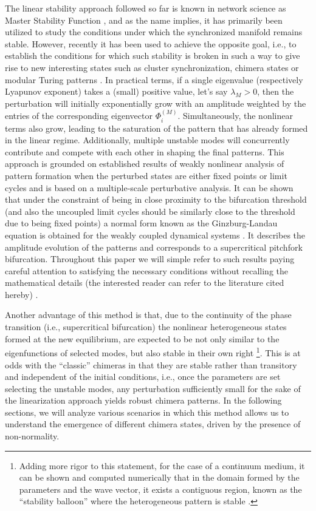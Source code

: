 \documentclass[prx,twocolumn,amsmath,noshowkeys,noshowpacs,amssymb]{revtex4-2}
\begin{document}
The linear stability approach followed so far is known in network science as Master Stability Function \cite{MSF}, and as the name implies, it has primarily been utilized to study the conditions under which the synchronized manifold remains stable. However, recently it has been used to achieve the opposite goal, i.e., to establish the conditions for which such stability is broken in such a way to give rise to new interesting states such as cluster synchronization, chimera states or modular Turing patterns \cite{Siebert, symm_break}. In practical terms, if a single eigenvalue (respectively Lyapunov exponent) takes a {(small)} positive value, let's say $\lambda_M>0$, then the perturbation will initially exponentially grow with an amplitude weighted by the entries of the corresponding eigenvector $\Phi_i^{(M)}$. Simultaneously, the nonlinear terms also grow, leading to the saturation of the pattern that has already formed in the linear regime. Additionally, multiple unstable modes will concurrently contribute and compete with each other in shaping the final patterns. {This approach is grounded on established results of weakly nonlinear analysis of pattern formation when the perturbed states are either fixed points or limit cycles and is based on a multiple-scale perturbative analysis. It can be shown that under the constraint of being in close proximity to the bifurcation threshold \cite{contemori_multiple-scale_2016} (and also the uncoupled limit cycles should be similarly close to the threshold due to being fixed points) a normal form known as the Ginzburg-Landau equation is obtained for the weakly coupled dynamical systems \cite{cross_pattern_2009, nakao_complex_2014}. It describes the amplitude evolution of the patterns and corresponds to a supercritical pitchfork bifurcation. Throughout this paper we will simple refer to such results paying careful attention to satisfying the necessary conditions without recalling the mathematical details (the interested reader can refer to the literature cited hereby) \cite{cross_pattern_2009, kuramoto_book, nakao_complex_2014, contemori_multiple-scale_2016, di_patti_ginzburg-landau_2018}.} 

Another advantage of this method is that, due to the continuity of the phase transition (i.e., supercritical bifurcation) the nonlinear heterogeneous states formed at the new equilibrium, are expected to be not only similar to the eigenfunctions of selected modes, but also stable in their own right \footnote{{Adding more rigor to this statement, for the case of a continuum medium, it can be shown and computed numerically that in the domain formed by the parameters and the wave vector, it exists a contiguous region, known as the ``stability balloon'' where the heterogeneous pattern is stable \cite{cross_pattern_2009}.}}. {This} is at odds with the ``classic'' chimeras in that they are stable rather than transitory and independent of the initial conditions, i.e., once the parameters are set selecting the unstable modes, any perturbation sufficiently small for the sake of the linearization approach yields robust chimera patterns. In the following sections, we will analyze various scenarios in which this method allows us to understand the emergence of different chimera states, driven by the presence of non-normality. 
\end{document}
